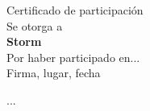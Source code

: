 \documentclass{article}
\begin{document}
\begin{center}
    \Huge Certificado de participación\\[1cm]
    \Large Se otorga a\\[0.5cm]
    \textbf{\LARGE Storm}\\[0.5cm]
    Por haber participado en...\\[2cm]
    Firma, lugar, fecha
\end{center}

\newpage

...
\end{document}
